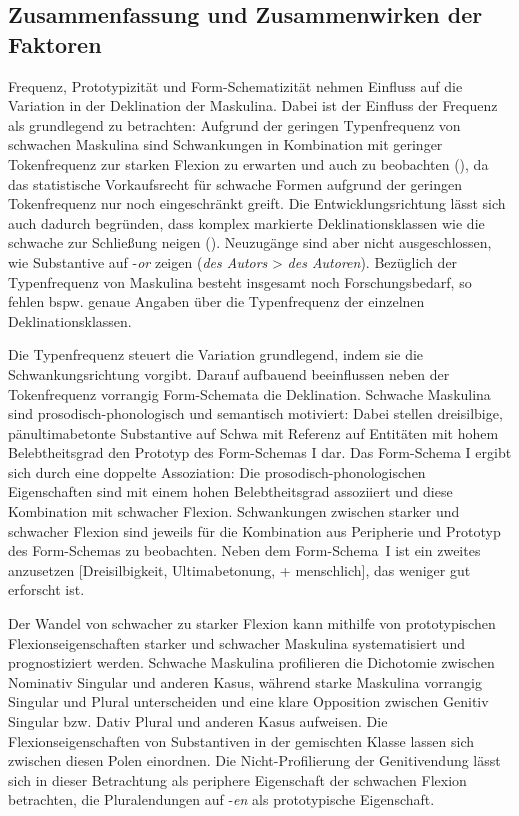 \subsection{Zusammenfassung und Zusammenwirken der Faktoren} 
\label{zusmask}
\begin{sloppypar}
Frequenz, Prototypizität und Form-Schematizität nehmen Einfluss auf die Variation in der Deklination der Maskulina. Dabei ist der Einfluss der Frequenz als grundlegend zu betrachten: Aufgrund der geringen Typenfrequenz von schwachen Maskulina sind Schwankungen in Kombination mit geringer Tokenfrequenz zur starken Flexion zu erwarten und auch zu beobachten (\cite[404--405]{Schafer.2019}), da das statistische Vorkaufsrecht für schwache Formen aufgrund der geringen Tokenfrequenz nur noch eingeschränkt greift. Die Entwicklungsrichtung lässt sich auch dadurch begründen, dass komplex markierte Deklinationsklassen wie die schwache zur Schließung neigen (\cite[173]{Nubling.2016}). Neuzugänge sind aber nicht ausgeschlossen, wie Substantive auf -\textit{or} zeigen (\textit{des Autors} > \textit{des Autoren}). Bezüglich der Typenfrequenz von Maskulina besteht insgesamt noch Forschungsbedarf, so fehlen bspw. genaue Angaben über die Typenfrequenz der einzelnen Deklinationsklassen. 
\end{sloppypar}


Die Typenfrequenz steuert die Variation grundlegend, indem sie die Schwankungsrichtung vorgibt. Darauf aufbauend beeinflussen neben der Tokenfrequenz vorrangig Form-Schemata die Deklination. Schwache Maskulina sind prosodisch-phonologisch und semantisch motiviert: Dabei stellen dreisilbige, pänultimabetonte Substantive auf Schwa mit Referenz auf Entitäten mit hohem Belebtheitsgrad den Prototyp des Form-Schemas I dar. Das Form-Schema I ergibt sich durch eine doppelte Assoziation: Die prosodisch-phonologischen Eigenschaften sind mit einem hohen Belebtheitsgrad assoziiert und diese Kombination mit schwacher Flexion. Schwankungen zwischen starker und schwacher Flexion sind jeweils für die Kombination aus Peripherie und Prototyp des Form-Schemas zu beobachten. Neben dem Form-Schema~I ist ein zweites anzusetzen [Dreisilbigkeit, Ultimabetonung, + menschlich], das weniger gut erforscht ist. 

Der Wandel von schwacher zu starker Flexion kann mithilfe von prototypischen Flexionseigenschaften starker und schwacher Maskulina systematisiert und prognostiziert werden. Schwache Maskulina profilieren die Dichotomie zwischen Nominativ Singular und anderen Kasus, während starke Maskulina vorrangig Singular und Plural unterscheiden und eine klare Opposition zwischen Genitiv Singular bzw. Dativ Plural und anderen Kasus aufweisen. Die Flexionseigenschaften von Substantiven in der gemischten Klasse lassen sich zwischen diesen Polen einordnen. Die Nicht-Profilierung der Genitivendung lässt sich in dieser Betrachtung als periphere Eigenschaft der schwachen Flexion betrachten, die Pluralendungen auf -\textit{en} als prototypische Eigenschaft.    



